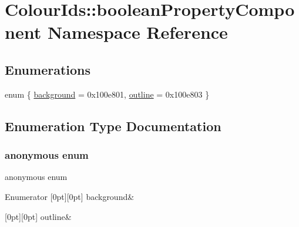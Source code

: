 \hypertarget{namespaceColourIds_1_1booleanPropertyComponent}{}\section{Colour\+Ids\+:\+:boolean\+Property\+Component Namespace Reference}
\label{namespaceColourIds_1_1booleanPropertyComponent}
\subsection*{Enumerations}
\begin{DoxyCompactItemize}
\item 
enum \{ \mbox{\hyperlink{namespaceColourIds_1_1booleanPropertyComponent_a417fc0adb8d50c33d274632afc7740a1a5335a1d1bbb1ecd23a38dd5395f17d8d}{background}} = 0x100e801, 
\mbox{\hyperlink{namespaceColourIds_1_1booleanPropertyComponent_a417fc0adb8d50c33d274632afc7740a1a67662817335d6c20dee2ccacc49a8ed9}{outline}} = 0x100e803
 \}
\end{DoxyCompactItemize}


\subsection{Enumeration Type Documentation}
\mbox{\label{namespaceColourIds_1_1booleanPropertyComponent_a417fc0adb8d50c33d274632afc7740a1}} 
\subsubsection{\texorpdfstring{anonymous enum}{anonymous enum}}
{\footnotesize\ttfamily anonymous enum}

\begin{DoxyEnumFields}{Enumerator}
[0pt][0pt]{}\mbox{\label{namespaceColourIds_1_1booleanPropertyComponent_a417fc0adb8d50c33d274632afc7740a1a5335a1d1bbb1ecd23a38dd5395f17d8d}} 
background&\\
\hline

[0pt][0pt]{}\mbox{\label{namespaceColourIds_1_1booleanPropertyComponent_a417fc0adb8d50c33d274632afc7740a1a67662817335d6c20dee2ccacc49a8ed9}} 
outline&\\
\hline

\end{DoxyEnumFields}

